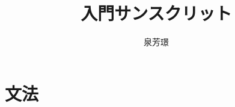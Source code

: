 \documentclass[12pt]{ltjsbook}
\title{入門サンスクリット}
\author{泉芳璟}
\begin{document}
\maketitle

\tableofcontents




\part{文法}


\end{document}
